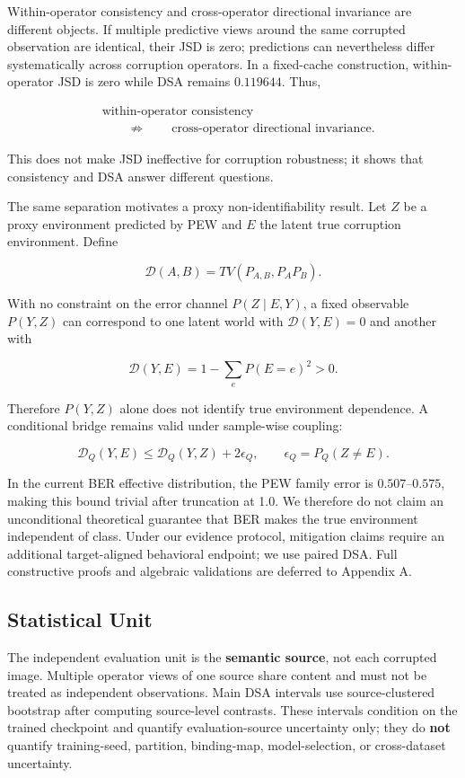 Within-operator consistency and cross-operator directional invariance are different objects. If multiple predictive views around the same corrupted observation are identical, their JSD is zero; predictions can nevertheless differ systematically across corruption operators. In a fixed-cache construction, within-operator JSD is zero while DSA remains \(0.119644\). Thus,

\[
\begin{aligned}
&\text{within-operator consistency}\\
&\qquad\not\Rightarrow\qquad
\text{cross-operator directional invariance}.
\end{aligned}
\]

This does not make JSD ineffective for corruption robustness; it shows that consistency and DSA answer different questions.

The same separation motivates a proxy non-identifiability result. Let \(Z\) be a proxy environment predicted by PEW and \(E\) the latent true corruption environment. Define

\[
\mathcal D(A,B)=TV(P_{A,B},P_AP_B).
\]

With no constraint on the error channel \(P(Z\mid E,Y)\), a fixed observable \(P(Y,Z)\) can correspond to one latent world with \(\mathcal D(Y,E)=0\) and another with

\[
\mathcal D(Y,E)=1-\sum_eP(E=e)^2>0.
\]

Therefore \(P(Y,Z)\) alone does not identify true environment dependence. A conditional bridge remains valid under sample-wise coupling:

\[
\mathcal D_Q(Y,E)\le
\mathcal D_Q(Y,Z)+2\epsilon_Q,
\qquad
\epsilon_Q=P_Q(Z\neq E).
\]

In the current BER effective distribution, the PEW family error is \(0.507\)--\(0.575\), making this bound trivial after truncation at 1.0. We therefore do not claim an unconditional theoretical guarantee that BER makes the true environment independent of class. Under our evidence protocol, mitigation claims require an additional target-aligned behavioral endpoint; we use paired DSA. Full constructive proofs and algebraic validations are deferred to Appendix A.

\subsection{Statistical Unit}

The independent evaluation unit is the \textbf{semantic source}, not each corrupted image. Multiple operator views of one source share content and must not be treated as independent observations. Main DSA intervals use source-clustered bootstrap after computing source-level contrasts. These intervals condition on the trained checkpoint and quantify evaluation-source uncertainty only; they do \textbf{not} quantify training-seed, partition, binding-map, model-selection, or cross-dataset uncertainty.

